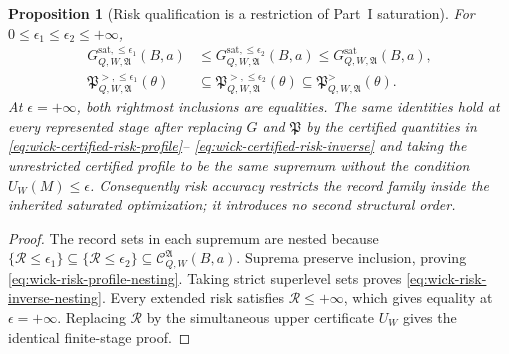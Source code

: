 \documentclass[11pt]{article}
\numberwithin{section}{part}
\theoremstyle{plain}
\newtheorem{proposition}[proposition]{Proposition}
\theoremstyle{definition}
\theoremstyle{remark}
\begin{document}
\begin{proposition}[Risk qualification is a restriction of Part~I saturation]
\label{prop:wick-risk-qualified-saturation-inheritance}
For \(0\le\epsilon_1\le\epsilon_2\le+\infty\),
\begin{align}
 G_{Q,W,\mathfrak A}^{\mathrm{sat},\le\epsilon_1}(B,a)
 &\le
 G_{Q,W,\mathfrak A}^{\mathrm{sat},\le\epsilon_2}(B,a)
 \le G_{Q,W,\mathfrak A}^{\mathrm{sat}}(B,a),
 \label{eq:wick-risk-profile-nesting}\\
 \mathfrak P_{Q,W,\mathfrak A}^{>,\le\epsilon_1}(\theta)
 &\subseteq
 \mathfrak P_{Q,W,\mathfrak A}^{>,\le\epsilon_2}(\theta)
 \subseteq
 \mathfrak P_{Q,W,\mathfrak A}^{>}(\theta).
 \label{eq:wick-risk-inverse-nesting}
\end{align}
At \(\epsilon=+\infty\), both rightmost inclusions are equalities.  The same
identities hold at every represented stage after replacing \(G\) and
\(\mathfrak P\) by the certified quantities in
\eqref{eq:wick-certified-risk-profile}--
\eqref{eq:wick-certified-risk-inverse} and taking the unrestricted certified
profile to be the same supremum without the condition \(U_W(M)\le\epsilon\).
Consequently risk accuracy restricts the record family inside the inherited
saturated optimization; it introduces no second structural order.
\end{proposition}

\begin{proof}
The record sets in each supremum are nested because
\(\{\mathcal R\le\epsilon_1\}\subseteq
  \{\mathcal R\le\epsilon_2\}\subseteq\mathcal C_{Q,W}^{\mathfrak A}(B,a)\).
Suprema preserve inclusion, proving \eqref{eq:wick-risk-profile-nesting}.
Taking strict superlevel sets proves \eqref{eq:wick-risk-inverse-nesting}.
Every extended risk satisfies \(\mathcal R\le+\infty\), which gives equality
at \(\epsilon=+\infty\).  Replacing \(\mathcal R\) by the simultaneous upper
certificate \(U_W\) gives the identical finite-stage proof.
\end{proof}
\end{document}
